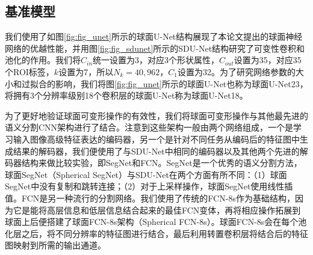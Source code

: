 \subsection{基准模型}
我们使用了如图\ref{fig:fig_unet}所示的球面U-Net结构展现了本论文提出的球面神经网络的优越性能，并用图\ref{fig:fig_sdunet}所示的SDU-Net结构研究了可变性卷积和池化的作用。我们将$C_{in}$统一设置为3，对应3个形状属性，$C_{out}$设置为35，对应35个ROI标签，$k$设置为7，所以$N_k=40,962$，$C_1$设置为32。为了研究网络参数的大小和过拟合的影响，我们将图\ref{fig:fig_unet}所示的球面U-Net也称为球面U-Net23，将拥有3个分辨率级别18个卷积层的球面U-Net称为球面U-Net18。

为了更好地验证球面可变形操作的有效性，我们将球面可变形操作与其他最先进的语义分割CNN架构进行了结合。注意到这些架构一般由两个网络组成，一个是学习输入图像高级特征表达的编码器，另一个是针对不同任务从编码后的特征图中生成结果的解码器，我们便使用了与SDU-Net中相同的编码器以及其他两个先进的解码器结构来做比较实验，即SegNet\cite{badrinarayanan2017segnet}和FCN\cite{long2015fully}。SegNet是一个优秀的语义分割方法，球面SegNet（Spherical SegNet）与SDU-Net在两个方面有所不同：（1）球面SegNet中没有复制和跳转连接；（2）对于上采样操作，球面SegNet使用线性插值。FCN是另一种流行的分割网络。我们使用了传统的FCN-8s\cite{long2015fully}作为基础结构，因为它是能将高层信息和低层信息结合起来的最佳FCN变体，再将相应操作拓展到球面上后便搭建了球面FCN-8s架构（Spherical FCN-8s）。球面FCN-8s会在每个池化层之后，将不同分辨率的特征图进行结合，最后利用转置卷积层将结合后的特征图映射到所需的输出通道。

